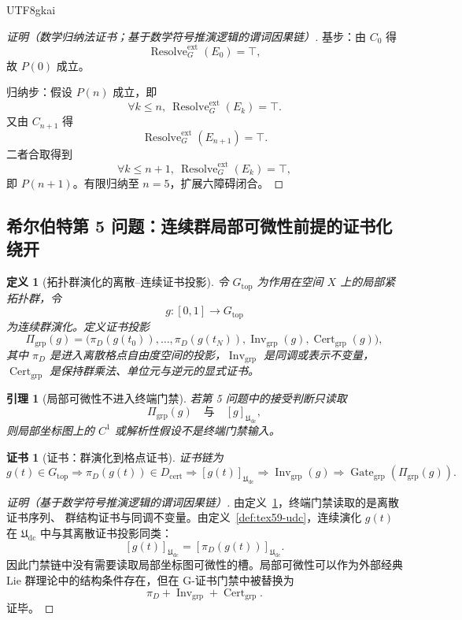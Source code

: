 \documentclass[12pt]{article}
\newtheorem{definition}{定义}[section]
\newtheorem{lemma}{引理}[section]
\newtheorem{Certificate}{证书}[section]
\newcommand{\Udc}{\mathfrak{U}_{\mathrm{dc}}}
\DeclareMathOperator{\Cert}{Cert}
\DeclareMathOperator{\Resolve}{Resolve}
\DeclareMathOperator{\Gate}{Gate}
\DeclareMathOperator{\Inv}{Inv}
\begin{document}
\begin{CJK*}{UTF8}{gkai}
\begin{proof}[证明（数学归纳法证书；基于数学符号推演逻辑的谓词因果链）]
基步：由 \(C_0\) 得
\[
  \Resolve_G^{\mathrm{ext}}(E_0)=\top,
\]
故 \(P(0)\) 成立。

归纳步：假设 \(P(n)\) 成立，即
\[
  \forall k\le n,\ \Resolve_G^{\mathrm{ext}}(E_k)=\top.
\]
又由 \(C_{n+1}\) 得
\[
  \Resolve_G^{\mathrm{ext}}(E_{n+1})=\top.
\]
二者合取得到
\[
  \forall k\le n+1,\ \Resolve_G^{\mathrm{ext}}(E_k)=\top,
\]
即 \(P(n+1)\)。有限归纳至 \(n=5\)，扩展六障碍闭合。
\end{proof}

\subsection{希尔伯特第 5 问题：连续群局部可微性前提的证书化绕开}
\label{subsec:tex59-hilbert5}

\begin{definition}[拓扑群演化的离散--连续证书投影]
\label{def:tex59-h5-projection}
令 \(G_{\mathrm{top}}\) 为作用在空间 \(X\) 上的局部紧拓扑群，令
\[
  g:[0,1]\to G_{\mathrm{top}}
\]
为连续群演化。定义证书投影
\[
  \Pi_{\mathrm{grp}}(g)
  =
  \bigl(
    \pi_D(g(t_0)),\ldots,\pi_D(g(t_N)),
    \Inv_{\mathrm{grp}}(g),
    \Cert_{\mathrm{grp}}(g)
  \bigr),
\]
其中 \(\pi_D\) 是进入离散格点自由度空间的投影，\(\Inv_{\mathrm{grp}}\) 是同调或表示不变量，
\(\Cert_{\mathrm{grp}}\) 是保持群乘法、单位元与逆元的显式证书。
\end{definition}

\begin{lemma}[局部可微性不进入终端门禁]
\label{lem:tex59-h5-no-smooth-gate}
若第 5 问题中的接受判断只读取
\[
  \Pi_{\mathrm{grp}}(g)
  \quad\text{与}\quad
  [g]_{\Udc},
\]
则局部坐标图上的 \(C^1\) 或解析性假设不是终端门禁输入。
\end{lemma}

\begin{Certificate}[证书：群演化到格点证书]
\label{cert:tex59-h5-no-smooth-gate}
证书链为
\[
  g(t)\in G_{\mathrm{top}}
  \Longrightarrow
  \pi_D(g(t))\in D_{\mathrm{cert}}
  \Longrightarrow
  [g(t)]_{\Udc}
  \Longrightarrow
  \Inv_{\mathrm{grp}}(g)
  \Longrightarrow
  \Gate_{\mathrm{grp}}(\Pi_{\mathrm{grp}}(g)).
\]
\end{Certificate}

\begin{proof}[证明（基于数学符号推演逻辑的谓词因果链）]
由定义~\ref{def:tex59-h5-projection}，终端门禁读取的是离散证书序列、
群结构证书与同调不变量。由定义~\ref{def:tex59-udc}，连续演化 \(g(t)\) 在
\(\Udc\) 中与其离散证书投影同类：
\[
  [g(t)]_{\Udc}=[\pi_D(g(t))]_{\Udc}.
\]
因此门禁链中没有需要读取局部坐标图可微性的槽。局部可微性可以作为外部经典
Lie 群理论中的结构条件存在，但在 G-证书门禁中被替换为
\[
  \pi_D+\Inv_{\mathrm{grp}}+\Cert_{\mathrm{grp}}.
\]
证毕。
\end{proof}


\end{CJK*}
\end{document}
